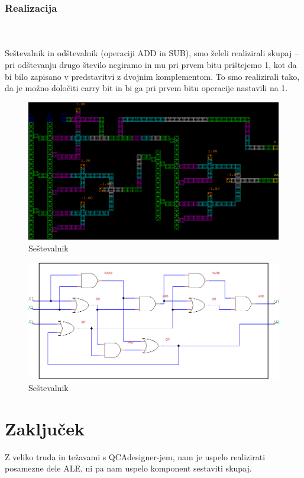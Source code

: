\documentclass[seminar, slovene]{FRIreport}
\begin{document}
\subsubsection{Realizacija}\ \\ \ \\
Seštevalnik in odštevalnik (operaciji ADD in SUB), smo želeli realizirali skupaj -- pri odštevanju drugo število negiramo in mu pri prvem bitu prištejemo 1, kot da bi bilo zapisano v predstavitvi z dvojnim komplementom. To smo realizirali tako, da je možno določiti carry bit in bi ga pri prvem bitu operacije nastavili na 1.

\begin{figure}[H]
\begin{center}
\includegraphics[width=15cm]{qca/img/adder}
\caption{Seštevalnik}
\label{sestevalnikqca}
\end{center}
\end{figure}

\begin{figure}[H]
\includegraphics[width=14cm]{vezja/img/adder}
\caption{Seštevalnik}
\label{sestevalnik}
\end{figure}

%
\section{Zaključek}
Z veliko truda in težavami s QCAdesigner-jem, nam je uspelo realizirati posamezne dele ALE, ni pa nam uspelo komponent sestaviti skupaj.

%
\References


\end{document}
